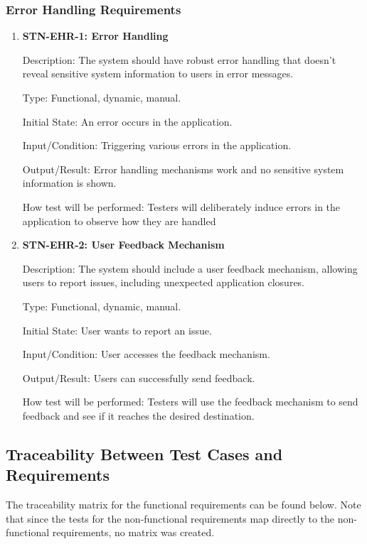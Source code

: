 \documentclass[12pt, titlepage]{article}
\begin{document}
\subsubsection{Error Handling Requirements}

\begin{enumerate}

\item {\textbf{STN-EHR-1: Error Handling}}

Description: The system should have robust error handling that doesn’t reveal sensitive system information to users in error messages.

Type: Functional, dynamic, manual.

Initial State: An error occurs in the application.

Input/Condition: Triggering various errors in the application.

Output/Result: Error handling mechanisms work and no sensitive system information is shown.

How test will be performed: Testers will deliberately induce errors in the application to observe how they are handled

\item{\textbf{STN-EHR-2: User Feedback Mechanism}}

Description: The system should include a user feedback mechanism, allowing users to report issues, including unexpected application closures.

Type: Functional, dynamic, manual.

Initial State: User wants to report an issue.

Input/Condition: User accesses the feedback mechanism.

Output/Result: Users can successfully send feedback.

How test will be performed: Testers will use the feedback mechanism to send feedback and see if it reaches the desired destination.

\end{enumerate}


\subsection{Traceability Between Test Cases and Requirements}
The traceability matrix for the functional requirements can be found below. Note that since the tests for the non-functional requirements map directly to the non-functional requirements, no matrix was created.
\end{document}
